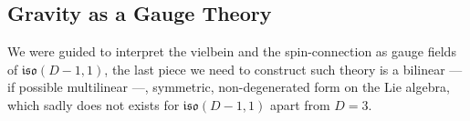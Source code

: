 \documentclass[a0,portrait]{a0poster}
\begin{document}
\begin{multicols}{2}
\section*{Gravity as a Gauge Theory}

We were guided to interpret the vielbein and the spin-connection as gauge fields of $\mathfrak{iso}(D-1,1)$, the last piece we need 
to construct such theory is a bilinear --- if possible multilinear ---, symmetric, non-degenerated form on the Lie algebra, which sadly does 
not exists for $\mathfrak{iso}(D-1,1)$ apart from $D=3$.











\end{multicols}
\end{document}
